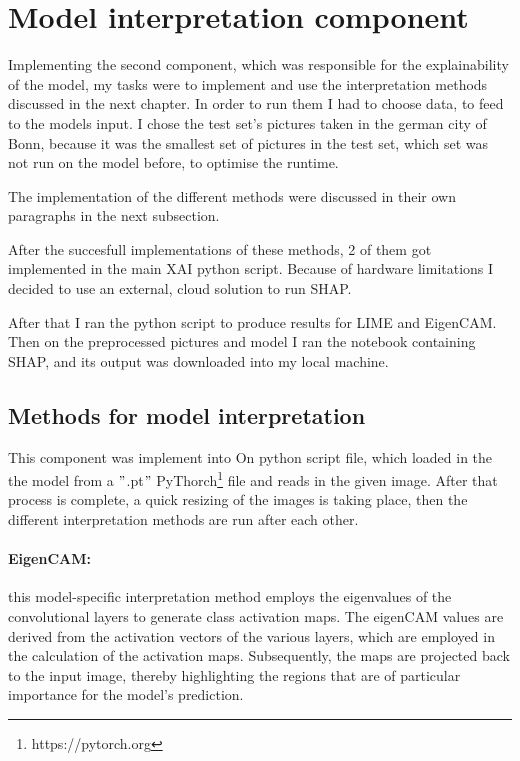 


\section{Model interpretation component}\label{sec:model-interpretation2}
Implementing the second component, which was responsible for the explainability of the model, my tasks were to implement and use the interpretation methods discussed in the next chapter.
In order to run them I had to choose data, to feed to the models input.
I chose the test set's pictures taken in the german city of Bonn,
because it was the smallest set of pictures in the test set, which set was not run on the model before, to optimise the runtime.

The implementation of the different methods were discussed in their own paragraphs in the next subsection.

After the succesfull implementations of these methods, 2 of them got implemented in the main XAI python script. Because of hardware limitations I decided to use an external, cloud solution to run SHAP.

After that I ran the python script to produce results for LIME and EigenCAM. Then on the preprocessed pictures and model I ran the notebook containing SHAP, and its output was downloaded into my local machine.

\subsection{Methods for model interpretation}\label{subsec:methods-for-model-interpretation}

This component was implement into On python script file, which loaded in the the model from a \("\).pt\("\) PyThorch\footnote{https://pytorch.org} file and reads in the given image.
After that process is complete, a quick resizing of the images is taking place, then the different interpretation methods are run after each other.

\paragraph{EigenCAM:}\label{par:eigencam}
this model-specific interpretation method employs the eigenvalues of the convolutional layers to generate class activation maps.
The eigenCAM values are derived from the activation vectors of the various layers, which are employed in the calculation of the activation maps.
Subsequently, the maps are projected back to the input image, thereby highlighting the regions that are of particular importance for the model's prediction.

